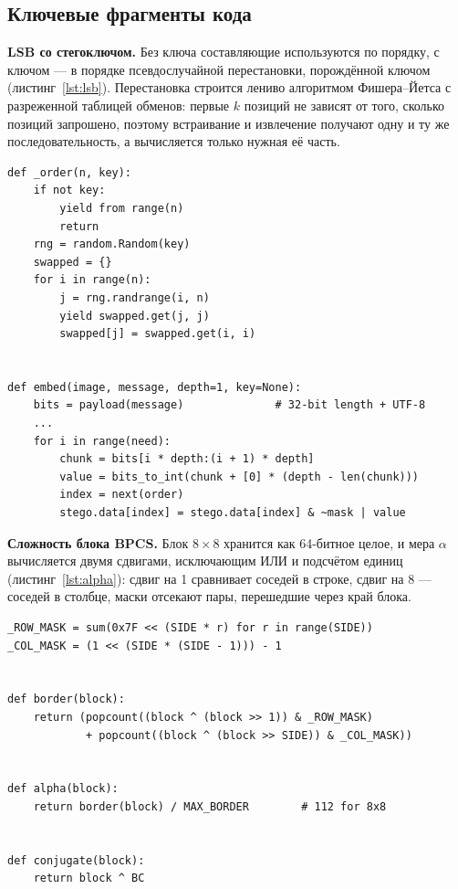 \documentclass[14pt,a4paper]{extarticle}
\begin{document}
\subsection{Ключевые фрагменты кода}

\textbf{LSB со стегоключом.} Без ключа составляющие используются по порядку, с
ключом --- в порядке псевдослучайной перестановки, порождённой ключом
(листинг~\ref{lst:lsb}). Перестановка строится лениво алгоритмом Фишера--Йетса с
разреженной таблицей обменов: первые $k$ позиций не зависят от того, сколько позиций
запрошено, поэтому встраивание и извлечение получают одну и ту же последовательность,
а вычисляется только нужная её часть.

\begin{lstlisting}[style=python, caption={Порядок составляющих и встраивание LSB}, label={lst:lsb}]
def _order(n, key):
    if not key:
        yield from range(n)
        return
    rng = random.Random(key)
    swapped = {}
    for i in range(n):
        j = rng.randrange(i, n)
        yield swapped.get(j, j)
        swapped[j] = swapped.get(i, i)


def embed(image, message, depth=1, key=None):
    bits = payload(message)              # 32-bit length + UTF-8
    ...
    for i in range(need):
        chunk = bits[i * depth:(i + 1) * depth]
        value = bits_to_int(chunk + [0] * (depth - len(chunk)))
        index = next(order)
        stego.data[index] = stego.data[index] & ~mask | value
\end{lstlisting}

\textbf{Сложность блока BPCS.} Блок $8 \times 8$ хранится как 64-битное целое, и мера
$\alpha$ вычисляется двумя сдвигами, исключающим ИЛИ и подсчётом единиц
(листинг~\ref{lst:alpha}): сдвиг на 1 сравнивает соседей в строке, сдвиг на 8 ---
соседей в столбце, маски отсекают пары, перешедшие через край блока.

\begin{lstlisting}[style=python, caption={Мера alpha и конъюнкция}, label={lst:alpha}]
_ROW_MASK = sum(0x7F << (SIDE * r) for r in range(SIDE))
_COL_MASK = (1 << (SIDE * (SIDE - 1))) - 1


def border(block):
    return (popcount((block ^ (block >> 1)) & _ROW_MASK)
            + popcount((block ^ (block >> SIDE)) & _COL_MASK))


def alpha(block):
    return border(block) / MAX_BORDER        # 112 for 8x8


def conjugate(block):
    return block ^ BC
\end{lstlisting}
\end{document}
